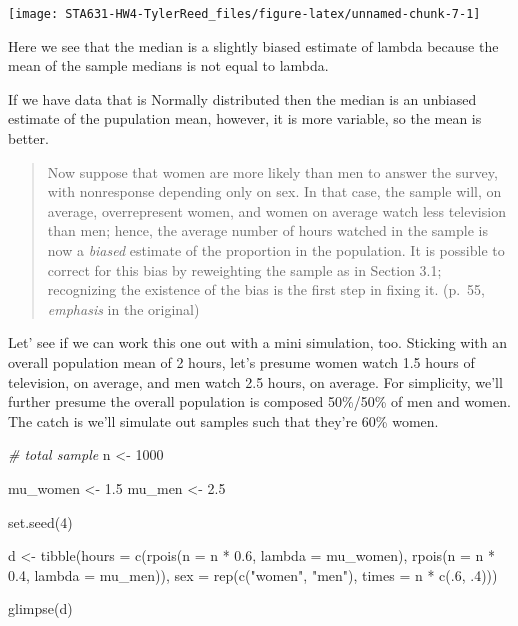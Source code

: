 \documentclass[
]{article}
\newenvironment{Shaded}{\begin{snugshade}}{\end{snugshade}}
\newcommand{\AttributeTok}[1]{\textcolor[rgb]{0.77,0.63,0.00}{#1}}
\newcommand{\CommentTok}[1]{\textcolor[rgb]{0.56,0.35,0.01}{\textit{#1}}}
\newcommand{\DecValTok}[1]{\textcolor[rgb]{0.00,0.00,0.81}{#1}}
\newcommand{\FloatTok}[1]{\textcolor[rgb]{0.00,0.00,0.81}{#1}}
\newcommand{\FunctionTok}[1]{\textcolor[rgb]{0.00,0.00,0.00}{#1}}
\newcommand{\NormalTok}[1]{#1}
\newcommand{\OtherTok}[1]{\textcolor[rgb]{0.56,0.35,0.01}{#1}}
\newcommand{\SpecialCharTok}[1]{\textcolor[rgb]{0.00,0.00,0.00}{#1}}
\newcommand{\StringTok}[1]{\textcolor[rgb]{0.31,0.60,0.02}{#1}}
\begin{document}
\begin{center}\texttt{[image: STA631-HW4-TylerReed\_files/figure-latex/unnamed-chunk-7-1]} \end{center}

Here we see that the median is a slightly biased estimate of lambda
because the mean of the sample medians is not equal to lambda.

If we have data that is Normally distributed then the median is an
unbiased estimate of the pupulation mean, however, it is more variable,
so the mean is better.

\begin{quote}
Now suppose that women are more likely than men to answer the survey,
with nonresponse depending only on sex. In that case, the sample will,
on average, overrepresent women, and women on average watch less
television than men; hence, the average number of hours watched in the
sample is now a \emph{biased} estimate of the proportion in the
population. It is possible to correct for this bias by reweighting the
sample as in Section 3.1; recognizing the existence of the bias is the
first step in fixing it. (p.~55, \emph{emphasis} in the original)
\end{quote}

Let' see if we can work this one out with a mini simulation, too.
Sticking with an overall population mean of 2 hours, let's presume women
watch 1.5 hours of television, on average, and men watch 2.5 hours, on
average. For simplicity, we'll further presume the overall population is
composed 50\%/50\% of men and women. The catch is we'll simulate out
samples such that they're 60\% women.

\begin{Shaded}
\begin{Highlighting}[]
\CommentTok{\# total sample}
\NormalTok{n }\OtherTok{\textless{}{-}} \DecValTok{1000}

\NormalTok{mu\_women }\OtherTok{\textless{}{-}} \FloatTok{1.5}
\NormalTok{mu\_men   }\OtherTok{\textless{}{-}} \FloatTok{2.5}

\FunctionTok{set.seed}\NormalTok{(}\DecValTok{4}\NormalTok{)}

\NormalTok{d }\OtherTok{\textless{}{-}}
  \FunctionTok{tibble}\NormalTok{(}\AttributeTok{hours =} \FunctionTok{c}\NormalTok{(}\FunctionTok{rpois}\NormalTok{(}\AttributeTok{n =}\NormalTok{ n }\SpecialCharTok{*} \FloatTok{0.6}\NormalTok{, }\AttributeTok{lambda =}\NormalTok{ mu\_women),}
                   \FunctionTok{rpois}\NormalTok{(}\AttributeTok{n =}\NormalTok{ n }\SpecialCharTok{*} \FloatTok{0.4}\NormalTok{, }\AttributeTok{lambda =}\NormalTok{ mu\_men)),}
         \AttributeTok{sex  =} \FunctionTok{rep}\NormalTok{(}\FunctionTok{c}\NormalTok{(}\StringTok{"women"}\NormalTok{, }\StringTok{"men"}\NormalTok{), }\AttributeTok{times =}\NormalTok{ n }\SpecialCharTok{*} \FunctionTok{c}\NormalTok{(.}\DecValTok{6}\NormalTok{, .}\DecValTok{4}\NormalTok{)))}

\FunctionTok{glimpse}\NormalTok{(d)}
\end{Highlighting}
\end{Shaded}
\end{document}
